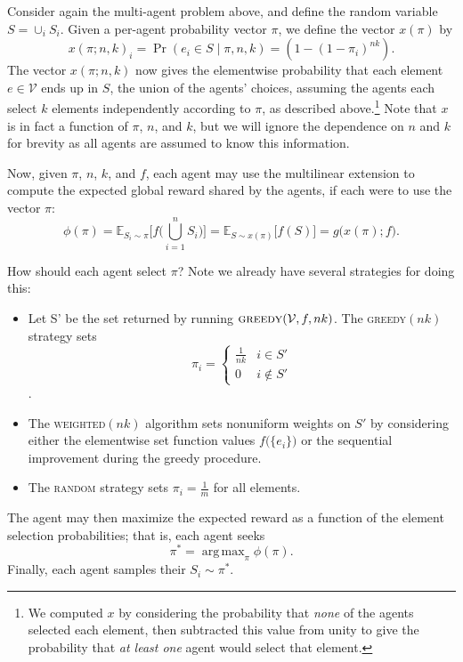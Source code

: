 \documentclass{article}
\newcommand{\given}{\mid}
\newcommand{\cm}[1]{\mathcal{#1}}
\DeclareMathOperator*{\argmax}{arg\,max}
\begin{document}
Consider again the multi-agent problem above, and define the random
variable $S = \cup_i S_i$.  Given a per-agent probability vector $\pi$,
we define the vector $x(\pi)$ by
\[
  x(\pi; n, k)_i
  = \Pr(e_i \in S \given \pi, n, k)
  = (1 - (1 - \pi_i)^{nk}).
\]
The vector $x(\pi; n, k)$ now gives the elementwise probability that
each element $e \in \cm{V}$ ends up in $S$, the union of the agents'
choices, assuming the agents each select $k$ elements independently
according to $\pi$, as described above.\footnote{We computed $x$ by
  considering the probability that \emph{none} of the agents selected
  each element, then subtracted this value from unity to give the
  probability that \emph{at least one} agent would select that
  element.}  Note that $x$ is in fact a function of $\pi$, $n$, and
$k$, but we will ignore the dependence on $n$ and $k$ for brevity
as all agents are assumed to know this information.

Now, given $\pi$, $n$, $k$, and $f$, each agent may use the
multilinear extension to compute the expected global reward shared
by the agents, if each were to use the vector $\pi$:
\[
  \phi(\pi)
  =
  \mathbb{E}_{S_i \sim \pi}
  \Biggl[
    f\biggl( \bigcup_{i = 1}^n S_i \biggr)
  \Biggr]
  =
  \mathbb{E}_{S \sim x(\pi)}[f(S)\bigr]
  =
  g\bigl(x(\pi); f\bigr).
\]

How should each agent select $\pi$?  Note we already have several
strategies for doing this:
\begin{itemize}
\item Let S' be the set returned by running
  $\text{\textsc{greedy}}(\cm{V}, f, nk)$. The \textsc{greedy}$(nk)$
  strategy sets
  \[
    \pi_i =
    \begin{cases}
      \frac{1}{nk} & i \in S' \\
      0            & i \notin S'
    \end{cases}
  \].
\item
  The \textsc{weighted}$(nk)$ algorithm sets nonuniform weights on
  $S'$ by considering either the elementwise set function values
  $f\bigl(\{e_i\}\bigr)$ or the sequential improvement during the
  greedy procedure.
\item
  The \textsc{random} strategy sets $\pi_i = \frac{1}{m}$ for all
  elements.
\end{itemize}

The agent may then maximize the expected reward as a function of the
element selection probabilities; that is, each agent seeks
\[
  \pi^\ast
  =
  \argmax_\pi \phi(\pi).
\]
Finally, each agent samples their $S_i \sim \pi^\ast$.
\end{document}
